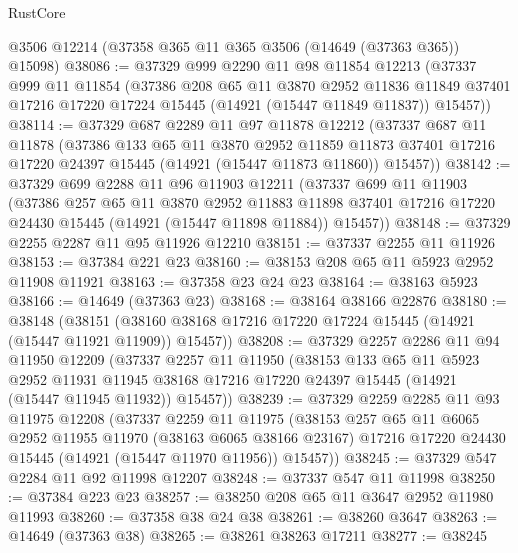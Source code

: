 \begin{lexlean}{RustCore}
\begin{coremodule}
    @3506
    @12214
    (@37358 @365 @11 @365 @3506 (@14649 (@37363 @365)) @15098)
@38086 := @37329
    @999
    @2290
    @11
    @98
    @11854
    @12213
    (@37337
      @999
      @11
      @11854
      (@37386
        @208
        @65
        @11
        @3870
        @2952
        @11836
        @11849
        @37401
        @17216
        @17220
        @17224
        @15445
        (@14921 (@15447 @11849 @11837))
        @15457))
@38114 := @37329
    @687
    @2289
    @11
    @97
    @11878
    @12212
    (@37337
      @687
      @11
      @11878
      (@37386
        @133
        @65
        @11
        @3870
        @2952
        @11859
        @11873
        @37401
        @17216
        @17220
        @24397
        @15445
        (@14921 (@15447 @11873 @11860))
        @15457))
@38142 := @37329
    @699
    @2288
    @11
    @96
    @11903
    @12211
    (@37337
      @699
      @11
      @11903
      (@37386
        @257
        @65
        @11
        @3870
        @2952
        @11883
        @11898
        @37401
        @17216
        @17220
        @24430
        @15445
        (@14921 (@15447 @11898 @11884))
        @15457))
@38148 := @37329 @2255 @2287 @11 @95 @11926 @12210
@38151 := @37337 @2255 @11 @11926
@38153 := @37384 @221 @23
@38160 := @38153 @208 @65 @11 @5923 @2952 @11908 @11921
@38163 := @37358 @23 @24 @23
@38164 := @38163 @5923
@38166 := @14649 (@37363 @23)
@38168 := @38164 @38166 @22876
@38180 := @38148
    (@38151 (@38160 @38168 @17216 @17220 @17224 @15445 (@14921 (@15447 @11921 @11909)) @15457))
@38208 := @37329
    @2257
    @2286
    @11
    @94
    @11950
    @12209
    (@37337
      @2257
      @11
      @11950
      (@38153
        @133
        @65
        @11
        @5923
        @2952
        @11931
        @11945
        @38168
        @17216
        @17220
        @24397
        @15445
        (@14921 (@15447 @11945 @11932))
        @15457))
@38239 := @37329
    @2259
    @2285
    @11
    @93
    @11975
    @12208
    (@37337
      @2259
      @11
      @11975
      (@38153
        @257
        @65
        @11
        @6065
        @2952
        @11955
        @11970
        (@38163 @6065 @38166 @23167)
        @17216
        @17220
        @24430
        @15445
        (@14921 (@15447 @11970 @11956))
        @15457))
@38245 := @37329 @547 @2284 @11 @92 @11998 @12207
@38248 := @37337 @547 @11 @11998
@38250 := @37384 @223 @23
@38257 := @38250 @208 @65 @11 @3647 @2952 @11980 @11993
@38260 := @37358 @38 @24 @38
@38261 := @38260 @3647
@38263 := @14649 (@37363 @38)
@38265 := @38261 @38263 @17211
@38277 := @38245

\end{coremodule}
\end{lexlean}
